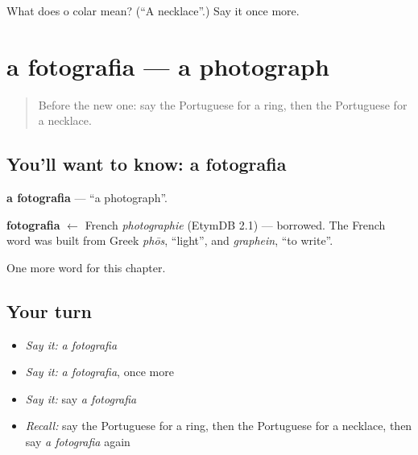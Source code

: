 \begin{tcolorbox}[breakable,colback=teal!4,colframe=teal!35!black,title={Before you move on}]
What does o colar mean? (\textquotedblleft{}A necklace\textquotedblright{}.) Say it once more.
\end{tcolorbox}
\section[a fotografia]{a fotografia — a photograph}

\label{lesson:PT-C101-fotografia}



\begin{quote}
Before the new one: say the Portuguese for a ring, then the Portuguese for a necklace.
\end{quote}

\subsection*{You'll want to know: a fotografia}
\textbf{a fotografia} — \textquotedblleft{}a photograph\textquotedblright{}.

\begin{cousinweb}
\textbf{fotografia} $\leftarrow$ French \emph{photographie} (EtymDB 2.1) — borrowed. The French word was built from Greek \emph{phōs}, \textquotedblleft{}light\textquotedblright{}, and \emph{graphein}, \textquotedblleft{}to write\textquotedblright{}.
\end{cousinweb}

\begin{grammarlens}[title={What you've built}]
One more word for this chapter.
\end{grammarlens}

\subsection*{Your turn}
\begin{itemize}
\raggedright
  \item \emph{Say it:} \emph{a fotografia}
  \item \emph{Say it:} \emph{a fotografia}, once more
  \item \emph{Say it:} say \emph{a fotografia}
  \item \emph{Recall:} say the Portuguese for a ring, then the Portuguese for a necklace, then say \emph{a fotografia} again
\end{itemize}

